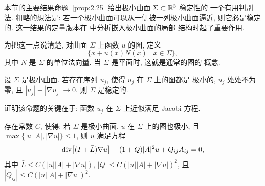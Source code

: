 本节的主要结果命题~\ref{prop:2.25} 给出极小曲面 $\Sigma\subset\mathbb{R}^3$ 稳定性的
一个有用判别法. 粗略的想法是: 若一个极小曲面可以从一侧被一列极小曲面逼近,
则它必是稳定的. 这一结果的定量版本在 \cite{CM4} 中分析嵌入极小曲面的局部
结构时起了重要作用.

为把这一点说清楚, 对曲面 $\Sigma$ 上函数 $u$ 的图, 定义
\begin{equation}
\bigl\{x+u(x)N(x)\mid x\in\Sigma\bigr\},
\label{eq:2.112}
\end{equation}
其中 $N$ 是 $\Sigma$ 的单位法向量. 当 $\Sigma$ 是平面时, 这就是通常的图的
概念.

\begin{proposition}
\label{prop:2.25}
设 $\Sigma$ 是极小曲面. 若存在序列 $u_j$, 使得 $u_j$ 在 $\Sigma$ 上的图都是
极小的, $u_j$ 处处不为零, 且 $|u_j|+|\nabla u_j|\to0$, 则 $\Sigma$ 是稳定的.
\end{proposition}

证明该命题的关键在于: 函数 $u_j$ 在 $\Sigma$ 上近似满足 Jacobi 方程.

\begin{lemma}
\label{lem:2.26}
存在常数 $C$, 使得: 若 $\Sigma$ 是极小曲面, $u$ 在 $\Sigma$ 上的图也极小, 且
$\max\{|u||A|,|\nabla u|\}\leq1$, 则 $u$ 满足方程
\begin{equation}
\operatorname{div}\bigl[(I+\bar L)\nabla u\bigr]+(1+Q)|A|^{2}u+Q_{ij}A_{ij}=0,
\label{eq:2.113}
\end{equation}
其中 $\bar L\leq C(|u||A|+|\nabla u|)$,
$|Q|\leq C(|u||A|+|\nabla u|)^{2}$, 且
$|Q_{ij}|\leq C(|u||A|+|\nabla u|)^{2}$.
\end{lemma}

